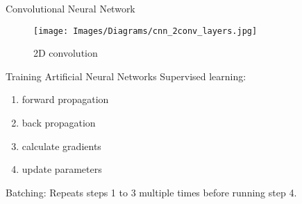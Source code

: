 \begin{frame}{Convolutional Neural Network}
    \begin{figure}
        \centering
        \texttt{[image: Images/Diagrams/cnn\_2conv\_layers.jpg]}
        \caption{2D convolution}
    \end{figure}
\end{frame}

\begin{frame}{Training Artificial Neural Networks}
    Supervised learning:\\%
    \begin{enumerate}
        \item forward propagation %
        \item back propagation %
        \item calculate gradients %
        \item update parameters %
    \end{enumerate}
    Batching: Repeats steps 1 to 3 multiple times before running step 4.
\end{frame}


